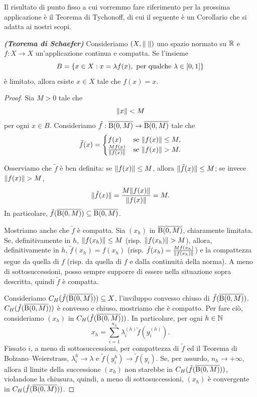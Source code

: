 Il risultato di punto fisso a cui vorremmo fare riferimento per la prossima applicazione è il Teorema di Tychonoff, di cui il seguente è un Corollario che si adatta ai nostri scopi.
\begin{corollario}\emph{\textbf{(Teorema di Schaefer)}}
	Consideriamo $(X,\lVert\;\rVert)$ uno spazio normato su $\mathbb{R}$ e $f: X \to X$ un'applicazione continua e compatta. Se l'insieme
	\[ B = \left\lbrace  x \in X : x = \lambda f(x), \textup{ per qualche } \lambda \in [0,1]\right\rbrace  \]
	è limitato, allora esiste $x \in X$ tale che $f(x) = x$.
\end{corollario}
\begin{proof}
	Sia $M > 0$ tale che 
	\[ \lVert x\rVert<M \]
	per ogni $x \in B$. Consideriamo $\tilde{f}: \overline{\textup{B}(0,M)} \to \overline{\textup{B}(0,M)}$ tale che
	\[ \tilde{f}(x) = \begin{cases} 
		f(x) & \textup{se } \lVert f(x)\rVert\le M,\\
		\frac{Mf(x)}{\lVert f(x)\rVert} & \textup{se } \lVert f(x)\rVert> M.
	\end{cases} \]
	
	Osserviamo che $\tilde{f}$ è ben definita: se $\lVert f(x)\rVert\le M$, allora $\lVert\tilde{f}(x)\rVert \le M$; se invece $ \lVert f(x)\rVert> M$, 
	\[ \lVert\tilde{f}(x)\rVert = \frac{M \lVert f(x)\rVert}{\lVert f(x)\rVert} =M.\]
	In particolare, $\tilde{f}(\overline{\textup{B}(0,M)}) \subseteq \overline{\textup{B}(0,M)}$.
	
	Mostriamo anche che $\tilde{f}$ è compatta. Sia $(x_h)$ in $\overline{\textup{B}(0,M)}$, chiaramente limitata. Se, definitivamente in $h$, $\lVert f(x_h)\rVert\le M$ (risp. $\lVert f(x_h)\rVert > M$), allora, definitivamente in $h$, $\tilde{f}(x_h) = f(x_h)$ (risp. $\tilde{f}(x_h) = \frac{Mf(x_h)}{\lVert f(x_h)\rVert}$) e la compattezza segue da quella di $f$ (risp. da quella di $f$ e dalla continuità della norma). A meno di sottosuccessioni, posso sempre supporre di essere nella situazione sopra descritta, quindi $\tilde{f}$ è compatta.
	
	Consideriamo $C_H(\tilde{f}(\overline{\textup{B}(0,M)})) \subseteq X$, l'inviluppo convesso chiuso di $\tilde{f}(\overline{\textup{B}(0,M)})$. $C_H(\tilde{f}(\overline{\textup{B}(0,M)}))$ è convesso e chiuso, mostriamo che è compatto. Per fare ciò, consideriamo $(x_h)$ in $C_H(\tilde{f}(\overline{\textup{B}(0,M)}))$. In particolare, per ogni $h \in \mathbb{N}$
	\[ x_h = \sum_{i=1}^{n_h}\lambda_i^{(h)}\tilde{f}(y_i^{(h)}). \]
	Fissato $i$, a meno di sottosuccessioni, per compattezza di $\tilde{f}$ ed il Teorema di Bolzano--Weierstrass, $\lambda_i^{h} \to \lambda$ e $\tilde{f}(y_i^{h}) \to \tilde{f}(y_i)$. Se, per assurdo, $n_{h} \to +\infty$, allora il limite della successione $(x_h)$ non starebbe in  $C_H(\tilde{f}(\overline{\textup{B}(0,M)}))$, violandone la chiusura, quindi, a meno di sottosuccessioni, $(x_h)$ è convergente in $C_H(\tilde{f}(\overline{\textup{B}(0,M)}))$.
	

\end{proof}
